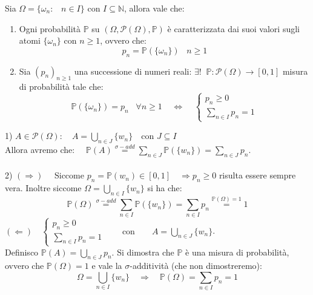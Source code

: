 \begin{teorema}
\label{th:2.7}
     Sia $\Omega = \{\omega_n: \;\;\;n\in I\}$ con $I\subseteq \mathbb{N}$, allora vale che:
    \begin{enumerate}
        \item Ogni probabilità $\mathbb{P}$ su $(\Omega, \mathcal{P}(\Omega), \mathbb{P})$ è caratterizzata dai suoi valori sugli atomi $\{\omega_n\}$ con $n\geq 1$, ovvero che:
        \[p_n=\mathbb{P}(\{\omega_n\})\;\;\;n\geq1\]
        \item Sia $(p_n)_{n\geq 1}$ una successione di numeri reali: $\exists! \;\;\mathbb{P}:\mathcal{P}(\Omega)\rightarrow[0,1]$ misura di probabilità tale che:
        \[\mathbb{P}(\{\omega_n\})=p_n\;\;\;\forall n\geq 1\;\;\;\; \iff \;\;\;\; 
        \begin{cases}
         p_n \geq 0 \\
         \sum_{n\in I}p_n=1
        \end{cases}
        \]
    \end{enumerate}
\begin{dimostrazione}
    1) $A\in\mathcal{P}(\Omega): \quad A = \bigcup_{n\in J}\{w_n\} \quad \text{con } J\subseteq I$\\
    Allora avremo che: $\quad \mathbb{P}(A) \overset{\sigma-add}{=} \sum_{n\in J}\mathbb{P}(\{w_n\}) = \sum_{n\in J} p_n$.\\
    \\
    2) $(\Rightarrow) \quad$ Siccome $p_n = \mathbb{P}(w_n)\in[0, 1]\quad \Rightarrow p_n \geq 0$ risulta essere sempre vera. Inoltre siccome $\Omega = \bigcup_{n\in I}\{w_n\}$ si ha che:
    \[\mathbb{P}(\Omega) \overset{\sigma-add}{=} \sum_{n\in I} \mathbb{P}(\{w_n\}) = \sum_{n\in I}p_n \overset{\mathbb{P}(\Omega)=1}{=}1\]
    $(\Leftarrow) \quad \begin{cases}
         p_n \geq 0 \\
         \sum_{n\in I}p_n=1
        \end{cases}
        \qquad \text{con} \qquad A = \bigcup_{n\in J}\{w_n\}$. \\
        Definisco $\mathbb{P}(A) = \bigcup_{n\in J}p_n$. Si dimostra che $\mathbb{P}$ è una misura di probabilità, ovvero che $\mathbb{P}(\Omega) = 1$ e vale la $\sigma$-additività (che non dimostreremo):
        \[\Omega = \bigcup_{n\in I}\{w_n\}\quad\Rightarrow\quad \mathbb{P}(\Omega) = \sum_{n\in I}p_n = 1\]
\end{dimostrazione}
\end{teorema}

